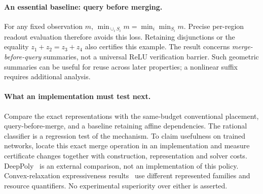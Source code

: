 \paragraph{An essential baseline: query before merging.}
For any fixed observation $m$, $\min_{\cup_iS_i}m=\min_i\min_{S_i}m$. Precise per-region readout evaluation therefore avoids this loss. Retaining disjunctions or the equality $z_1+z_2=z_3+z_4$ also certifies this example. The result concerns \emph{merge-before-query} summaries, not a universal ReLU verification barrier. Such geometric summaries can be useful for reuse across later properties; a nonlinear suffix requires additional analysis.


\paragraph{What an implementation must test next.}
Compare the exact representations with the same-budget conventional placement, query-before-merge, and a baseline retaining affine dependencies. The rational classifier is a regression test of the mechanism. To claim usefulness on trained networks, locate this exact merge operation in an implementation and measure certificate changes together with construction, representation and solver costs. DeepPoly~\cite{singh2019} is an external comparison, not an implementation of this policy. Convex-relaxation expressiveness results~\cite{mao2026} use different represented families and resource quantifiers. No experimental superiority over either is asserted.
